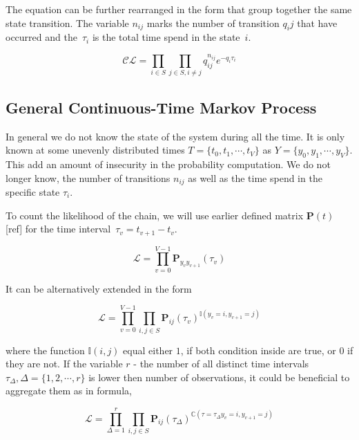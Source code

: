 \documentclass[thesis=M,english]{FITthesis}[2012/10/20]
\newcommand{\matr}[1]{\mathbf{#1}}
\begin{document}
The equation can be further rearranged in the form that group together the same state transition. The variable $n_{ij}$ marks the number of transition $q_ij$ that have occurred and the~$\tau_i$ is the total time spend in the state~$i$.

\begin{equation}\label{eq:CL2}
 \mathcal{CL} = \prod_{i \in S} \prod_{j \in S, i \neq j} q_{ij}^{n_{ij} } e^{ - q_i \tau_i }
\end{equation}

\subsection{ General Continuous-Time Markov Process }

In general we do not know the state of the system during all the time. It is only known at some unevenly distributed times $T = \{ t_0, t_1, \cdots, t_{V} \}$ as $Y= \{y_0, y_1, \cdots, y_{V} \}$. 
This add an amount of insecurity in the probability computation. We do not longer know, the number of transitions $n_{ij}$ as well as the time spend in the specific state $\tau_i$. 

To count the likelihood of the chain, we will use earlier defined matrix $\matr{P}(t)$ [ref] for the time interval~$\tau_v = t_{v+1} - t_v$.    

\begin{equation}
 \mathcal{L} = \prod_{v=0}^{V-1} \matr{P}_{y_v y_{v+1}}(\tau_v) 
\end{equation}

It can be alternatively extended in the form

\begin{equation}
 \mathcal{L} = \prod_{v=0}^{V-1} \prod_{i,j \in S}  \matr{P}_{ij}(\tau_v)^{\mathbb{I}( y_v = i, y_{v+1} = j )} 
\end{equation}

where the function $\mathbb{I}(i,j)$ equal either $1$, if both condition inside are true, or $0$ if they are not. 
If the variable $r$ - the number of all distinct time intervals $\tau_{\Delta}, \Delta =\{1,2,\cdots,r\}$ is lower then number of observations, it could be beneficial to aggregate them as in formula,

\begin{equation}\label{eq:CTL}
 \mathcal{L} = \prod_{\Delta = 1}^{r} \prod_{i,j \in S}  \matr{P}_{ij}(\tau_{\Delta})^{\mathbb{C}( \tau=\tau_{\Delta} y_v = i, y_{v+1} = j )} 
\end{equation}
\end{document}
